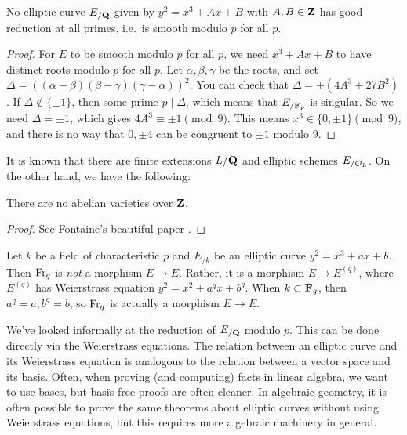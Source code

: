 \begin{theorem}
No elliptic curve $E_{/\mathbf{Q}}$ given by $y^2=x^3+A x+B$ with $A,B\in \mathbf{Z}$ has 
good reduction at all primes, i.e.~is smooth modulo $p$ for all $p$. 
\end{theorem}
\begin{proof}
For $E$ to be smooth modulo $p$ for all $p$, we need $x^3+A x+B$ to have 
distinct roots modulo $p$ for all $p$. Let $\alpha,\beta,\gamma$ be the roots, 
and set $\Delta=\left((\alpha-\beta)(\beta-\gamma)(\gamma-\alpha)\right)^2$. 
You can check that $\Delta=\pm (4 A^3+27 B^2)$. If $\Delta\notin \{\pm 1\}$, 
then some prime $p\mid\Delta$, which means that $E_{/\mathbf{F}_p}$ is singular. So 
we need $\Delta=\pm 1$, which gives $4 A^3\equiv \pm 1\pmod 9$. This means 
$x^3\in \{0,\pm 1\}\pmod 9$, and there is no way that 
$0,\pm 4$ can be congruent to $\pm 1$ modulo $9$. 
\end{proof}

It is known that there are finite extensions $L/\mathbf{Q}$ and elliptic 
schemes $E_{/\mathcal{O}_L}$. On the other hand, we have the following: 

\begin{theorem}[Fontaine]
There are no abelian varieties over $\mathbf{Z}$. 
\end{theorem}
\begin{proof}
See Fontaine's beautiful paper \cite{fontaine-1985}. 
\end{proof}


Let $k$ be a field of characteristic $p$ and $E_{/k}$ be an elliptic curve 
$y^2=x^3+a x+b$. Then $\operatorname{Fr}_q$ is \emph{not} a morphism $E\to E$. Rather, it 
is a morphism $E\to E^{(q)}$, where $E^{(q)}$ has Weierstrass equation 
$y^2=x^2+a^q x+b^q$. When $k\subset \mathbf{F}_q$, then $a^q=a,b^q=b$, so 
$\operatorname{Fr}_q$ is actually a morphism $E\to E$. 

We've looked informally at the reduction of $E_{/\mathbf{Q}}$ modulo $p$. This can be 
done directly via the Weierstrass equations. The relation between an elliptic 
curve and its Weierstrass equation is analogous to the relation between a 
vector space and its basis. Often, when proving (and computing) facts in 
linear algebra, we want to use bases, but basis-free proofs are often cleaner. 
In algebraic geometry, it is often possible to prove the same theorems about 
elliptic curves without using Weierstrass equations, but this requires more 
algebraic machinery in general. 

